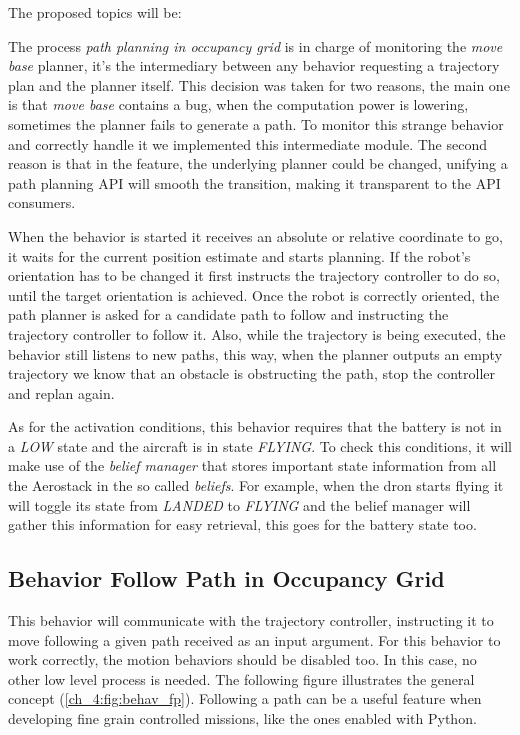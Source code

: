   The proposed topics will be:

  


  The process \textit{path planning in occupancy grid} is in charge of monitoring the \textit{move base} planner, it's the intermediary between any behavior requesting a trajectory plan and the planner itself. This decision was taken for two reasons, the main one is that \textit{move base} contains a bug, when the computation power is lowering, sometimes the planner fails to generate a path. To monitor this strange behavior and correctly handle it we implemented this intermediate module. The second reason is that in the feature, the underlying planner could be changed, unifying a path planning API will smooth the transition, making it transparent to the API consumers.

  When the behavior is started it receives an absolute or relative coordinate to go, it waits for the current position estimate and starts planning. If the robot's orientation has to be changed it first instructs the trajectory controller to do so, until the target orientation is achieved. Once the robot is correctly oriented, the path planner is asked for a candidate path to follow and instructing the trajectory controller to follow it. Also, while the trajectory is being executed, the behavior still listens to new paths, this way, when the planner outputs an empty trajectory we know that an obstacle is obstructing the path, stop the controller and replan again. 

  As for the activation conditions, this behavior requires that the battery is not in a \textit{LOW} state and the aircraft is in state \textit{FLYING}. To check this conditions, it will make use of the \textit{belief manager} that stores important state information from all the Aerostack in the so called \textit{beliefs}. For example, when the dron starts flying it will toggle its state from \textit{LANDED} to \textit{FLYING} and the belief manager will gather this information for easy retrieval, this goes for the battery state too.

\subsection{Behavior Follow Path in Occupancy Grid} \label{ch_4:subsect:behav_fpog}

  This behavior will communicate with the trajectory controller, instructing it to move following a given path received as an input argument. For this behavior to work correctly, the motion behaviors should be disabled too. In this case, no other low level process is needed. The following figure illustrates the general concept (\ref{ch_4:fig:behav_fp}). Following a path can be a useful feature when developing fine grain controlled missions, like the ones enabled with Python.

